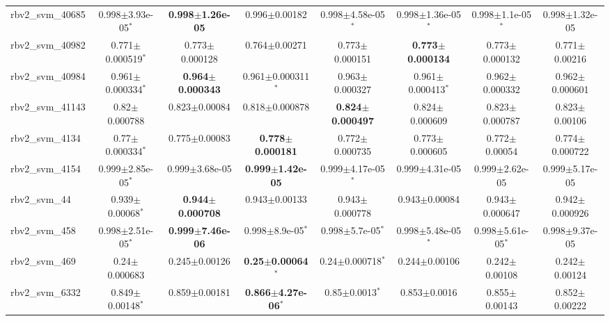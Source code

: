\begin{table}[t]
\begin{center}
\begin{tabular}{lccccccc}
rbv2\_svm\_40685 & 0.998$\pm$3.93e-05$^{*}$ & \textbf{0.998$\pm$1.26e-05} & 0.996$\pm$0.00182 & 0.998$\pm$4.58e-05$^{*}$ & 0.998$\pm$1.36e-05$^{*}$ & 0.998$\pm$1.1e-05$^{*}$ & 0.998$\pm$1.32e-05 \\
rbv2\_svm\_40982 & 0.771$\pm$0.000519$^{*}$ & 0.773$\pm$0.000128 & 0.764$\pm$0.00271 & 0.773$\pm$0.000151 & \textbf{0.773$\pm$0.000134} & 0.773$\pm$0.000132 & 0.771$\pm$0.00216 \\
rbv2\_svm\_40984 & 0.961$\pm$0.000334$^{*}$ & \textbf{0.964$\pm$0.000343} & 0.961$\pm$0.000311$^{*}$ & 0.963$\pm$0.000327 & 0.961$\pm$0.000413$^{*}$ & 0.962$\pm$0.000332 & 0.962$\pm$0.000601 \\
rbv2\_svm\_41143 & 0.82$\pm$0.000788 & 0.823$\pm$0.00084 & 0.818$\pm$0.000878 & \textbf{0.824$\pm$0.000497} & 0.824$\pm$0.000609 & 0.823$\pm$0.000787 & 0.823$\pm$0.00106 \\
rbv2\_svm\_4134 & 0.77$\pm$0.000334$^{*}$ & 0.775$\pm$0.00083 & \textbf{0.778$\pm$0.000181} & 0.772$\pm$0.000735 & 0.773$\pm$0.000605 & 0.772$\pm$0.00054 & 0.774$\pm$0.000722 \\
rbv2\_svm\_4154 & 0.999$\pm$2.85e-05$^{*}$ & 0.999$\pm$3.68e-05 & \textbf{0.999$\pm$1.42e-05} & 0.999$\pm$4.17e-05$^{*}$ & 0.999$\pm$4.31e-05 & 0.999$\pm$2.62e-05 & 0.999$\pm$5.17e-05 \\
rbv2\_svm\_44 & 0.939$\pm$0.00068$^{*}$ & \textbf{0.944$\pm$0.000708} & 0.943$\pm$0.00133 & 0.943$\pm$0.000778 & 0.943$\pm$0.00084 & 0.943$\pm$0.000647 & 0.942$\pm$0.000926 \\
rbv2\_svm\_458 & 0.998$\pm$2.51e-05$^{*}$ & \textbf{0.999$\pm$7.46e-06} & 0.998$\pm$8.9e-05$^{*}$ & 0.998$\pm$5.7e-05$^{*}$ & 0.998$\pm$5.48e-05$^{*}$ & 0.998$\pm$5.61e-05$^{*}$ & 0.998$\pm$9.37e-05 \\
rbv2\_svm\_469 & 0.24$\pm$0.000683 & 0.245$\pm$0.00126 & \textbf{0.25$\pm$0.00064}$^{*}$ & 0.24$\pm$0.000718$^{*}$ & 0.244$\pm$0.00106 & 0.242$\pm$0.00108 & 0.242$\pm$0.00124 \\
rbv2\_svm\_6332 & 0.849$\pm$0.00148$^{*}$ & 0.859$\pm$0.00181 & \textbf{0.866$\pm$4.27e-06}$^{*}$ & 0.85$\pm$0.0013$^{*}$ & 0.853$\pm$0.0016 & 0.855$\pm$0.00143 & 0.852$\pm$0.00222 \\
\hline
\end{tabular}
\end{center}
\end{table}